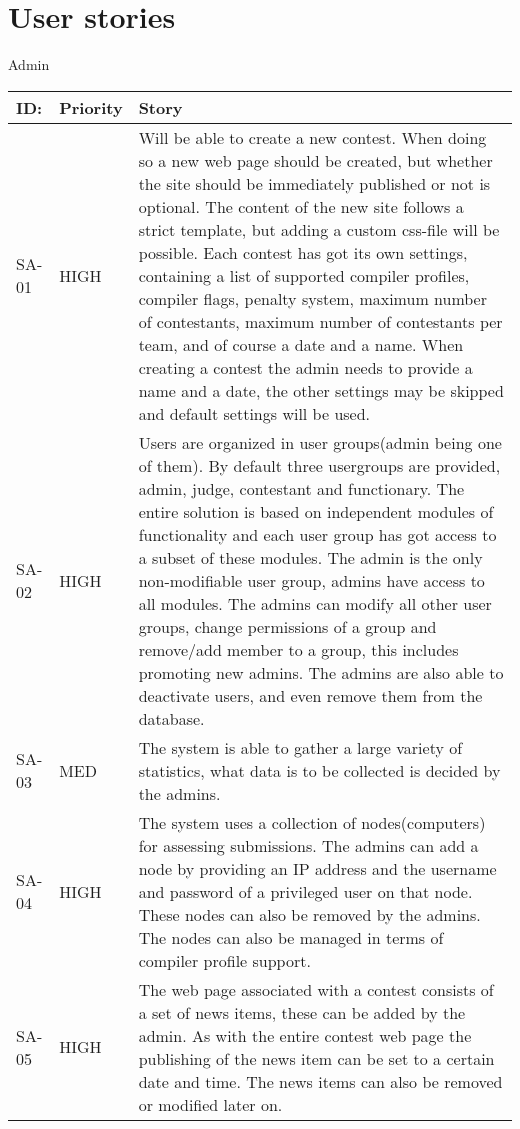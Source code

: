 \chapter{User stories}\label{appendix:userstories}

Admin

\begin{flushleft}
\tablehead{}
\begin{supertabular}{|p{0.1\textwidth}|p{0.1\textwidth}|p{0.8\textwidth}|}
\hline
ID: &
Priority &
Story\\\hline
SA{}-01 &
HIGH &
Will be able to create a new contest. When doing so a new web page
should be created, but whether the site should be immediately published
or not is optional. The content of the new site follows a strict
template, but adding a custom css{}-file will be possible. Each contest
has got its own settings, containing a list of supported compiler
profiles, compiler flags, penalty system, maximum number of
contestants, maximum number of contestants per team, and of course a
date and a name. When creating a contest the admin needs to provide a
name and a date, the other settings may be skipped and default settings
will be used.\\\hline
SA{}-02 &
HIGH &
Users are organized in user groups(admin being one of them). By default
three usergroups are provided, admin, judge, contestant and
functionary. The entire solution is based on independent modules of
functionality and each user group has got access to a subset of these
modules. The admin is the only non{}-modifiable user group, admins have
access to all modules. The admins can modify all other user groups,
change permissions of a group and remove/add member to a group, this
includes promoting new admins. The admins are also able to deactivate
users, and even remove them from the database.

\\\hline
SA{}-03 &
MED &
The system is able to gather a large variety of statistics, what data is
to be collected is decided by the admins.\\\hline
SA{}-04 &
HIGH &
The system uses a collection of nodes(computers) for assessing
submissions. The admins can add a node by providing an IP address and
the username and password of a privileged user on that node. These
nodes can also be removed by the admins. The nodes can also be managed
in terms of compiler profile support.\\\hline
SA{}-05 &
HIGH &
The web page associated with a contest consists of a set of news items,
these can be added by the admin. As with the entire contest web page
the publishing of the news item can be set to a certain date and time.
The news items can also be removed or modified later on.\\\hline
\end{supertabular}
\end{flushleft}

